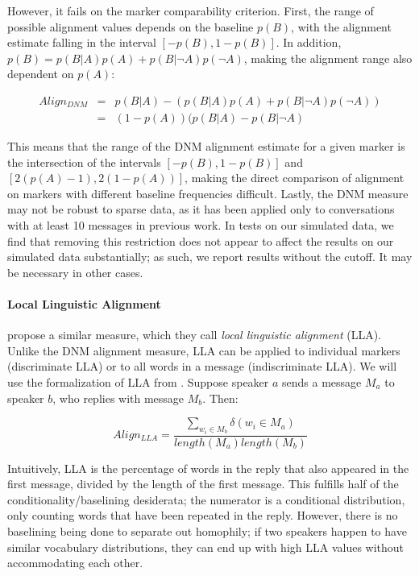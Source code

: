 \documentclass{acm_proc_article-sp}
\begin{document}
However, it fails on the marker comparability criterion.  First, the range of possible alignment values depends on the baseline $p(B)$, with the alignment estimate falling in the interval $[-p(B),1-p(B)]$.  In addition, $p(B) = p(B|A)p(A) + p(B|\neg A)p(\neg A)$, making the alignment range also dependent on $p(A)$:

\begin{align*}
Align_{DNM} & = & p(B|A) - (p(B|A)p(A) + p(B|\neg A)p(\neg A)) \\
& = & (1-p(A))(p(B|A) - p(B|\neg A)
\end{align*} 

This means that the range of the DNM alignment estimate for a given marker is the intersection of the intervals $[-p(B), 1-p(B)]$ and $[2(p(A)-1), 2(1-p(A))]$, making the direct comparison of alignment on markers with different baseline frequencies difficult.  Lastly, the DNM measure may not be robust to sparse data, as it has been applied only to conversations with at least 10 messages in previous work.  In tests on our simulated data, we find that removing this restriction does not appear to affect the results on our simulated data substantially; as such, we report results without the cutoff. It may be necessary in other cases.

\paragraph{Local Linguistic Alignment} \cite{Fusaroli2012} propose a similar measure, which they call \textit{local linguistic alignment} (LLA).  Unlike the DNM alignment measure, LLA can be applied to individual markers (discriminate LLA) or to all words in a message (indiscriminate LLA).  We will use the formalization of LLA from \cite{WangReitterYen2014}.  Suppose speaker $a$ sends a message $M_a$ to speaker $b$, who replies with message $M_b$. Then:

\begin{equation}
Align_{LLA} = \frac{\sum_{w_i \in M_b} \delta(w_i \in M_a)}{length(M_a)length(M_b)}
\end{equation}

Intuitively, LLA is the percentage of words in the reply that also appeared in the first message, divided by the length of the first message.  This fulfills half of the conditionality/baselining desiderata; the numerator is a conditional distribution, only counting words that have been repeated in the reply.  However, there is no baselining being done to separate out homophily; if two speakers happen to have similar vocabulary distributions, they can end up with high LLA values without accommodating each other.
\end{document}
